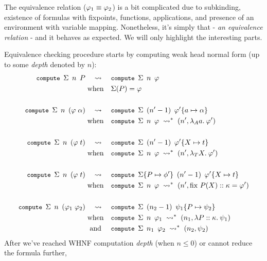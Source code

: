 \documentclass[english, mgr]{iithesis}
\renewcommand{\tt}[1]{\texttt{\small{#1}}}
\renewcommand{\it}[1]{\textit{#1}}
\begin{document}
The equivalence relation ($\varphi_1 \equiv \varphi_2$) is a bit complicated
due to subkinding, existence of formulas
with fixpoints, functions, applications,
and presence of an environment with variable mapping.
Nonetheless, it's simply that - \it{an equivalence relation} - and it
behaves as expected. We will only highlight the interesting parts.

Equivalence checking procedure starts by computing weak head normal form (up to some \it{depth} denoted by $n$):
\begin{align*}
\tt{compute }\Sigma\tt{ }n\tt{ }P
& \quad\leadsto\quad
\tt{compute }\Sigma\tt{ }n\tt{ }\formphi
\\
&\;\text{when} \quad \Sigma(P) = \formphi
\\ & \\
\tt{compute }\Sigma\tt{ }n\tt{ }{(\formphi \fAppAtom \atomexp )}
& \quad\leadsto\quad
\tt{compute }\Sigma\tt{ }(n' - 1)\tt{ }{\formphi'\subst{\atomv}{\atomexp}} \\
&\;\text{when} \quad \tt{compute }\Sigma\tt{ }n\tt{ }{\formphi} \;\leadsto^{*}\; (n',\fLamAtom{\atomv}\formphi')
\\ & \\
\tt{compute }\Sigma\tt{ }n\tt{ }{(\formphi \fAppTerm \term )}
& \quad\leadsto\quad
\tt{compute }\Sigma\tt{ }(n' - 1)\tt{ }{\formphi'\subst{\termv}{\term}} \\
&\;\text{when} \quad \tt{compute }\Sigma\tt{ }n\tt{ }{\formphi} \;\leadsto^{*}\; (n',\fLamTerm{\termv}\formphi')
\\ & \\
\tt{compute }\Sigma\tt{ }n\tt{ }{(\formphi \fAppTerm \term )}
& \quad\leadsto\quad
\tt{compute }\Sigma\subst{P}{\phi'}\tt{ }(n' - 1)\tt{ }{\formphi'\subst{\termv}{\term}}\\
&\;\text{when} \quad \tt{compute }\Sigma\tt{ }n\tt{ }{\formphi} \;\leadsto^{*}\; (n',\fix{P}{\termv}{\kind}\formphi')
\\ & \\
\tt{compute }\Sigma\tt{ }n\tt{ }{(\formphi_1 \fApp \formphi_2 )}
& \quad\leadsto\quad
\tt{compute }\Sigma\tt{ }(n_2 - 1)\tt{ }{\psi_1\subst{\propv}{\psi_2}}\\
&\;\text{when} \quad \tt{compute }\Sigma\tt{ }n\tt{ }{\formphi_1} \;\leadsto^{*}\; (n_1, \fLamForm{\propv}{\kind}{\psi_1})\\
&\;\text{ and } \quad \tt{compute }\Sigma\tt{ }n_1\tt{ }{\formphi_2} \;\leadsto^{*}\; (n_2, \psi_2)
\end{align*}
After we've reached WHNF computation \it{depth} (when $ n \leqslant 0$) or cannot reduce the formula further,
\end{document}

